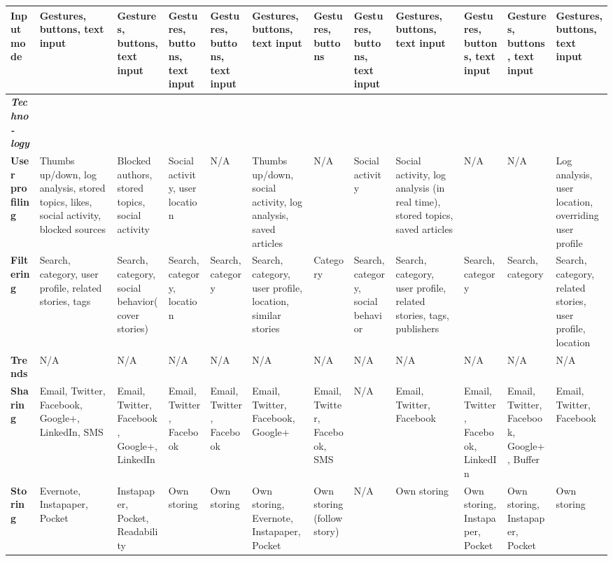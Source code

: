 \begin{landscape}
\begin{center}
\begin{longtable}{ | p{1.6cm} | p{1.6cm} | p{1.6cm} | p{1.6cm} | p{1.6cm} | p{1.6cm} | p{1.6cm} | p{1.6cm} | p{1.6cm} | p{1.6cm} | p{1.6cm} | p{1.6cm} |}
\textbf{Input mode} & Gestures, buttons, text input & Gestures, buttons, text input & Gestures, buttons, text input & Gestures, buttons, text input & Gestures, buttons, text input & Gestures, buttons & Gestures, buttons, text input & Gestures, buttons, text input & Gestures, buttons, text input & Gestures, buttons, text input & Gestures, buttons, text input \\ \hline

\textit{\textbf{Techno-logy}} &&&&&&&&&&& \\ \hline

\textbf{User profiling} & Thumbs up/down, log analysis, stored topics, likes, social activity, blocked sources & Blocked authors, stored topics, social activity & Social activity, user location & N/A & Thumbs up/down, social activity, log analysis, saved articles & N/A & Social activity & Social activity, log analysis (in real time), stored topics, saved articles & N/A & N/A & Log analysis, user location, overriding user profile \\ \hline

\textbf{Filtering} & Search, category, user profile, related stories, tags & Search, category, social behavior(cover stories) & Search, category, location & Search, category & Search, category, user profile, location, similar stories & Category & Search, category, social behavior & Search, category, user profile, related stories, tags, publishers & Search, category & Search, category & Search, category, related stories, user profile, location  \\ \hline

\textbf{Trends} & N/A & N/A & N/A & N/A & N/A & N/A & N/A & N/A & N/A & N/A & N/A\\ \hline

\textbf{Sharing} & Email, Twitter, Facebook, Google+, LinkedIn, SMS & Email, Twitter, Facebook, Google+, LinkedIn & Email, Twitter, Facebook & Email, Twitter, Facebook & Email, Twitter, Facebook, Google+ & Email, Twitter, Facebook, SMS & N/A & Email, Twitter, Facebook & Email, Twitter, Facebook, LinkedIn & Email, Twitter, Facebook, Google+, Buffer & Email, Twitter, Facebook \\ \hline

\textbf{Storing} & Evernote, Instapaper, Pocket & Instapaper, Pocket, Readability & Own storing & Own storing & Own storing, Evernote, Instapaper, Pocket & Own storing (follow story) & N/A & Own storing & Own storing, Instapaper, Pocket & Own storing, Instapaper, Pocket & Own storing \\ \hline

\end{longtable}
\end{center}
\end{landscape}
